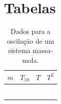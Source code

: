 \section{Tabelas}
\begin{table}[!htb]
\label{Tab:DadosMassaMola}
	\begin{center}
		\begin{tabular}{p{25mm}p{25mm}p{25mm}p{25mm}}
		\toprule
		$m$ & $T_{10}$ & $T$ & $T^2$ \\
		\midrule
		\cellcolor[gray]{0.89} & \cellcolor[gray]{0.92} & \cellcolor[gray]{0.89} & \cellcolor[gray]{0.92} \\
		\cellcolor[gray]{0.95} & \cellcolor[gray]{0.97} & \cellcolor[gray]{0.95} & \cellcolor[gray]{0.97} \\
		\cellcolor[gray]{0.89} & \cellcolor[gray]{0.92} & \cellcolor[gray]{0.89} & \cellcolor[gray]{0.92} \\
		\cellcolor[gray]{0.95} & \cellcolor[gray]{0.97} & \cellcolor[gray]{0.95} & \cellcolor[gray]{0.97} \\
		\cellcolor[gray]{0.89} & \cellcolor[gray]{0.92} & \cellcolor[gray]{0.89} & \cellcolor[gray]{0.92} \\
		\cellcolor[gray]{0.95} & \cellcolor[gray]{0.97} & \cellcolor[gray]{0.95} & \cellcolor[gray]{0.97} \\
		\bottomrule
		\end{tabular}
	\end{center}
	\caption{Dados para a oscilação de um sistema massa-mola.}
\end{table}
%
%
